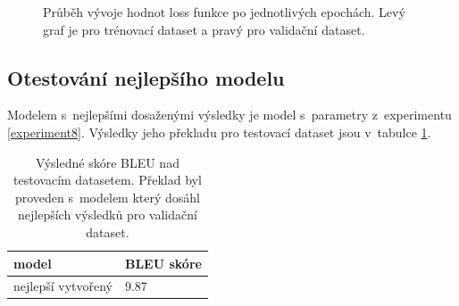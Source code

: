 \begin{figure}[H]
    \begin{center}
    \end{center}
	\caption{Průběh vývoje hodnot loss funkce po jednotlivých epochách. Levý graf je pro trénovací dataset a pravý pro validační dataset.}
\end{figure}

\subsection{Otestování nejlepšího modelu} \label{experimentBestModel}
Modelem s~nejlepšími dosaženými výsledky je model s~parametry z~experimentu \ref{experiment8}. Výsledky jeho překladu pro testovací dataset jsou v~tabulce \ref{table:bestResults}.

\begin{table}[H]
    \begin{center}
        \begin{tabular}{ll}
          \toprule
          model & BLEU skóre \\
          \midrule
          nejlepší vytvořený & 9.87 \\
          \bottomrule
        \end{tabular}
    \end{center}
	\caption{Výsledné skóre BLEU nad testovacím datasetem. Překlad byl proveden s~modelem který dosáhl nejlepších výsledků pro validační dataset.}
	\label{table:bestResults}
\end{table}


